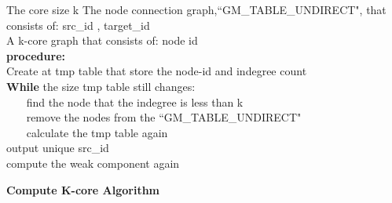 \documentclass[10pt]{article}
\begin{document}
\begin{algorithm}[h]
The core size k
The node connection graph,``GM\_TABLE\_UNDIRECT", that consists of: src\_id , target\_id \\
A k-core graph that consists of: node id \\
{\bf procedure:} \\
Create at tmp table that store the node-id and indegree count\\
{\bf While} the size tmp table still changes: \\
	~~~ find the node that the indegree is less than k \\
	~~~ remove the nodes from the ``GM\_TABLE\_UNDIRECT" \\
	~~~ calculate the tmp table again \\
output unique src\_id  \\
compute the weak component again  
\caption{{\bf Compute K-core Algorithm} \label{Algorithm}}

\end{algorithm}
\end{document}
